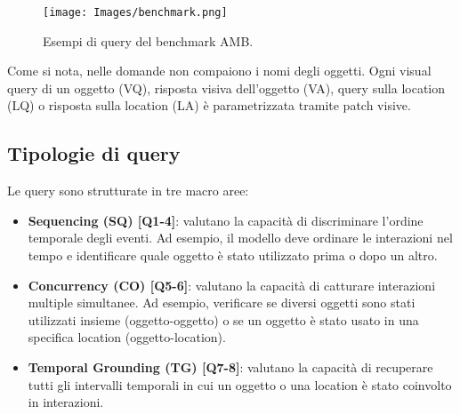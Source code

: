 \begin{figure}[ht]
    \centering
    \texttt{[image: Images/benchmark.png]}
    \caption{Esempi di query del benchmark AMB.}
    \label{fig:benchmark_queries}
\end{figure}

Come si nota, nelle domande non compaiono i nomi degli oggetti. Ogni visual query di un oggetto (VQ), risposta visiva dell'oggetto (VA), query sulla location (LQ) o risposta sulla location (LA) è parametrizzata tramite patch visive.

\subsection{Tipologie di query}

Le query sono strutturate in tre macro aree:
\begin{itemize}
    \item \textbf{\textcolor{sqcolor}{Sequencing (SQ) [Q1-4]}}: valutano la capacità di discriminare l'ordine temporale degli eventi. Ad esempio, il modello deve ordinare le interazioni nel tempo e identificare quale oggetto è stato utilizzato prima o dopo un altro.
    
    \item \textbf{\textcolor{cocolor}{Concurrency (CO) [Q5-6]}}: valutano la capacità di catturare interazioni multiple simultanee. Ad esempio, verificare se diversi oggetti sono stati utilizzati insieme (oggetto-oggetto) o se un oggetto è stato usato in una specifica location (oggetto-location).
    
    \item \textbf{\textcolor{tgcolor}{Temporal Grounding (TG) [Q7-8]}}: valutano la capacità di recuperare tutti gli intervalli temporali in cui un oggetto o una location è stato coinvolto in interazioni.
\end{itemize}

